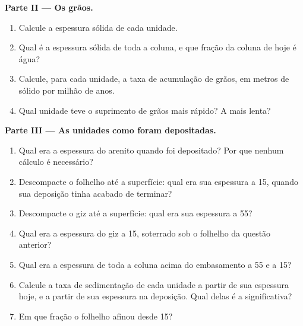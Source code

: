 \begin{problem}
\noindent\textbf{Parte II --- Os grãos.}
\begin{enumerate}[resume]
  \item Calcule a espessura sólida de cada unidade.
  \item Qual é a espessura sólida de toda a coluna, e que fração da coluna de hoje é água?
  \item Calcule, para cada unidade, a taxa de acumulação de grãos, em metros de sólido por
        milhão de anos.
  \item Qual unidade teve o suprimento de grãos mais rápido? A mais lenta?
\end{enumerate}

\noindent\textbf{Parte III --- As unidades como foram depositadas.}
\begin{enumerate}[resume]
  \item Qual era a espessura do arenito quando foi depositado? Por que nenhum cálculo é
        necessário?
  \item Descompacte o folhelho até a superfície: qual era sua espessura a \qty{15}{\Ma}, quando
        sua deposição tinha acabado de terminar?
  \item Descompacte o giz até a superfície: qual era sua espessura a \qty{55}{\Ma}?
  \item Qual era a espessura do giz a \qty{15}{\Ma}, soterrado sob o folhelho da questão
        anterior?
  \item Qual era a espessura de toda a coluna acima do embasamento a \qty{55}{\Ma} e a
        \qty{15}{\Ma}?
  \item Calcule a taxa de sedimentação de cada unidade a partir de sua espessura hoje, e a
        partir de sua espessura na deposição. Qual delas é a significativa?
  \item Em que fração o folhelho afinou desde \qty{15}{\Ma}?
\end{enumerate}


\end{problem}
